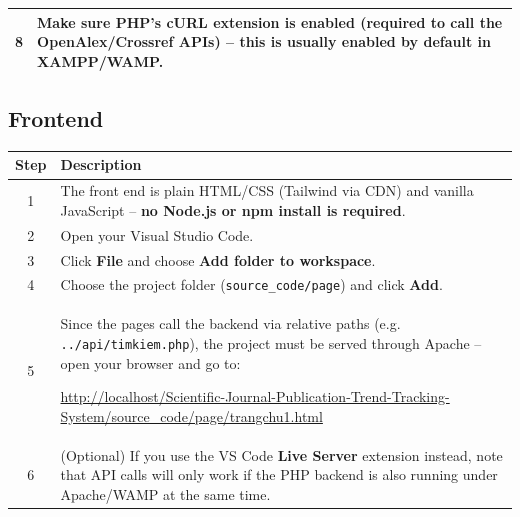 \documentclass[12pt,a4paper]{article}
\begin{document}
{{{\begin{table}[H]
\begin{tabularx}{\textwidth}{|c|X|}
			\rowcolor{yellowrow}
			8 & Make sure PHP's \textbf{cURL} extension is enabled (required to call the OpenAlex/Crossref APIs) -- this is usually enabled by default in XAMPP/WAMP. \\
			\hline
			
		\end{tabularx}
	\end{table}
}


\subsection{Frontend}

{
\begin{table}[H]
		\centering
		
		\begin{tabularx}{\textwidth}{|c|X|}
			\hline
			\rowcolor{blueheader}
			\textbf{Step} & \textbf{Description} \\
			\hline
			
			1 & The front end is plain HTML/CSS (Tailwind via CDN) and vanilla JavaScript -- \textbf{no Node.js or npm install is required}. \\
			\hline
			
			\rowcolor{bluerow}
			2 & Open your Visual Studio Code. \\
			\hline
			
			3 & Click \textbf{File} and choose \textbf{Add folder to workspace}. \\
			\hline
			
			\rowcolor{bluerow}
			4 & Choose the project folder (\texttt{source\_code/page}) and click \textbf{Add}. \\
			\hline
			
			5 & Since the pages call the backend via relative paths (e.g. \texttt{../api/timkiem.php}), the project must be served through Apache -- open your browser and go to:
			
			\url{http://localhost/Scientific-Journal-Publication-Trend-Tracking-System/source_code/page/trangchu1.html} \\
			\hline
			
			\rowcolor{bluerow}
			6 & (Optional) If you use the VS Code \textbf{Live Server} extension instead, note that API calls will only work if the PHP backend is also running under Apache/WAMP at the same time. \\
			\hline
			
		\end{tabularx}
	\end{table}
}


}}
\end{document}
